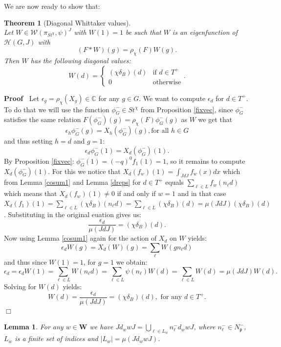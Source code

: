 \documentclass{article}
\newenvironment{proof}{\noindent\textbf{Proof\ }}{\hspace*{\fill}$\Box$\medskip}
\newtheorem{lemma}{Lemma}
\newtheorem{theorem}{Theorem}
\begin{document}
We are now ready to show that:
\begin{theorem}[Diagonal Whittaker values] \label{diagon} ~\\
 Let $W\in \mathcal{W}(\pi_{St^{\chi}},\psi)^{J}$ with $W(1)=1$ be such that $W$ is an eigenfunction of $\mathcal{H}(G,J)$ with $$(F*W)(g)=\rho_{\chi}(F)W(g).$$
	Then $W$ has the following diagonal values:
$$W(d)=\begin{cases}
       (\chi\delta_B)(d)  & \text{if $d\in T^+$} \\
        0 & \text{otherwise} 
    \end{cases}.$$
 \end{theorem}
 \begin{proof}
Let $\epsilon_{g}=\rho_{\chi}(X_{g})\in\mathbb{C}$ for any $g\in G$. 
We want to compute $\epsilon_d$ for $d\in T^+$. To do that we will use the function $\phi_G^-\in St^{\chi}$ from Proposition \ref{fixvec}, since $\phi_G^-$ satisfies the same relation $F(\phi_G^-)(g)=\rho_{\chi}(F)\phi_G^-(g)$ as $W$ we get that $$\epsilon_h\phi_G^-(g)=X_h(\phi_G^-)(g), \text{for all } h\in G$$
and thus setting $h=d$ and $g=1$:
$$\epsilon_d\phi_G^-(1)=X_d(\phi_G^-)(1).$$
By Proposition \ref{fixvec}: $\phi_G^-(1)=(-q)^0f_1(1)=1$, so it remains to compute $X_d(\phi_G^-)(1)$. For this we notice that $X_d(f_w)(1)=\int_{JdJ}f_w(x)dx$ which from Lemma \ref{cosum1} and Lemma \ref{dreps} for $d\in T^+$ equals $\sum\limits_{\ell\in L}f_w(n_{\ell}d)$ which means that $X_d(f_w)(1)\ne 0$ if and only if $w=1$ and in that case $X_d(f_1)(1)=\sum\limits_{\ell\in L}(\chi\delta_B)(n_{\ell}d)=\sum\limits_{\ell\in L}(\chi\delta_B)(d)=\mu(JdJ)(\chi\delta_B)(d)$. Substituting in the original euation gives us: $$\frac{\epsilon_d}{\mu(JdJ)}=(\chi\delta_B)(d).$$ Now using Lemma \ref{cosum1} again for the action of $X_d$ on $W$ yields: $$\epsilon_dW(g)=X_d(W)(g)=\sum\limits_{\ell}W(gn_{\ell}d)$$ and thus since $W(1)=1$, for $g=1$ we obtain: $$\epsilon_d=\epsilon_d W(1)=\sum\limits_{\ell\in L}W(n_{\ell}d)=\sum\limits_{\ell\in L}\psi(n_{\ell})W(d)=\sum\limits_{\ell\in L}W(d)=\mu(JdJ)W(d).$$ Solving for $W(d)$ yields: $$W(d)=\frac{\epsilon_d}{\mu(JdJ)}=(\chi\delta_B)(d), \text{ for any } d\in T^+.$$
 \end{proof}
\begin{lemma} \label{diagcos}
  For any $w\in\mathbf{W}$ we have $Jd_wwJ=\underset{\ell\in L_w}{\bigcup}n_{\ell}^-d_wwJ$, where $n_{\ell}^-\in N^-_{\mathfrak{p}}$, $L_w$ is a finite set of indices and $|L_w|=\mu(Jd_wwJ)$.
\end{lemma}
\end{document}
